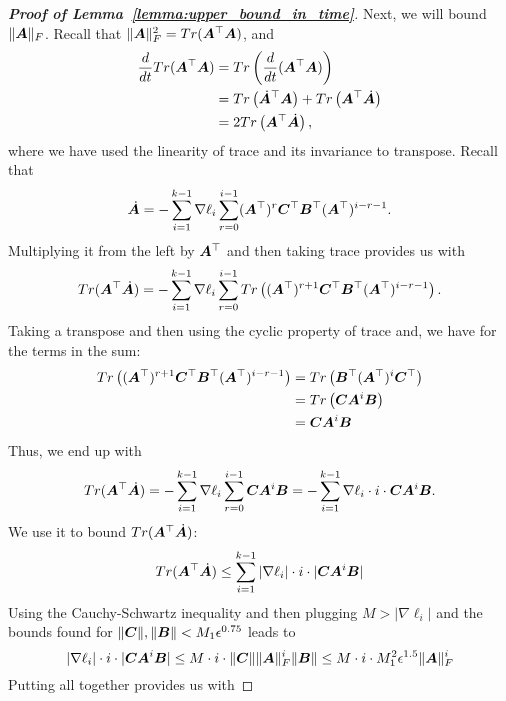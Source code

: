 \begin{proof}[\textbf{Proof of Lemma~\ref{lemma:upper_bound_in_time}}]
Next, we will bound $\|{\bm{A}}\|_F$.
%
Recall that $\|{\bm{A}}\|_F^2=Tr({\bm{A}}^\top {\bm{A}})$, and
\begin{align}
    \frac{d}{dt}Tr({\bm{A}}^\top {\bm{A}})& =Tr\left(\frac{d}{dt}({\bm{A}}^\top {\bm{A}})\right)\\
    & =Tr\left(\dot{{\bm{A}}}^\top {\bm{A}}\right) + Tr\left({\bm{A}}^\top \dot{{\bm{A}}}\right)\\
    & =2Tr\left( {\bm{A}}^\top \dot{{\bm{A}}} \right),
\end{align}
where we have used the linearity of trace and its invariance to transpose.
Recall that
\begin{equation}
    \dot{{\bm{A}}}=-\sum_{i=1}^{k-1}\nabla\ell_i\sum_{r=0}^{i-1}({\bm{A}}^\top)^r{\bm{C}}^\top {\bm{B}}^\top({\bm{A}}^\top)^{i-r-1}.
\end{equation}
Multiplying it from the left by ${\bm{A}}^\top$ and then taking trace provides us with
\begin{equation}
    Tr({\bm{A}}^\top \dot{{\bm{A}}})=-\sum_{i=1}^{k-1}\nabla\ell_i\sum_{r=0}^{i-1}Tr\left(({\bm{A}}^\top)^{r+1}{\bm{C}}^\top {\bm{B}}^\top({\bm{A}}^\top)^{i-r-1}\right).
\end{equation}
Taking a transpose and then using the cyclic property of trace and, we have for the terms in the sum:
\begin{align}
    Tr\left(({\bm{A}}^\top)^{r+1}{\bm{C}}^\top {\bm{B}}^\top({\bm{A}}^\top)^{i-r-1}\right)&=Tr\left({\bm{B}}^\top ({\bm{A}}^\top)^{i}{\bm{C}}^\top \right)\\
    & =Tr\left({\bm{C}}{\bm{A}}^i{\bm{B}}\right)\\
    & ={\bm{C}}{\bm{A}}^i{\bm{B}}
\end{align}
Thus, we end up with
\begin{equation}
    Tr({\bm{A}}^\top \dot{{\bm{A}}})=-\sum_{i=1}^{k-1}\nabla\ell_i\sum_{r=0}^{i-1}{\bm{C}}{\bm{A}}^i{\bm{B}} = -\sum_{i=1}^{k-1}\nabla\ell_i \cdot i\cdot {\bm{C}}{\bm{A}}^i{\bm{B}}.
\end{equation}
We use it to bound $Tr({\bm{A}}^\top \dot{{\bm{A}}})$:
\begin{equation}\label{eq:trace_bound}
    Tr({\bm{A}}^\top \dot{{\bm{A}}})\le \sum_{i=1}^{k-1}|\nabla\ell_i| \cdot i\cdot |{\bm{C}}{\bm{A}}^i{\bm{B}}|
\end{equation}
%
Using the Cauchy-Schwartz inequality and then plugging $M > |\nabla \ell_i|$ and the bounds found for $\|{\bm{C}}\|, \|{\bm{B}}\|<M_1 \epsilon^{0.75}$ leads to
\begin{equation}
    |\nabla\ell_i| \cdot i\cdot |{\bm{C}}{\bm{A}}^i{\bm{B}}| \leq M \cdot i \cdot \|{\bm{C}}\| \|{\bm{A}}\|_F^i \|{\bm{B}}\| \leq M \cdot i \cdot M_1^2 \epsilon^{1.5} \|{\bm{A}}\|_F^i
\end{equation}
Putting all together provides us with

\end{proof}
